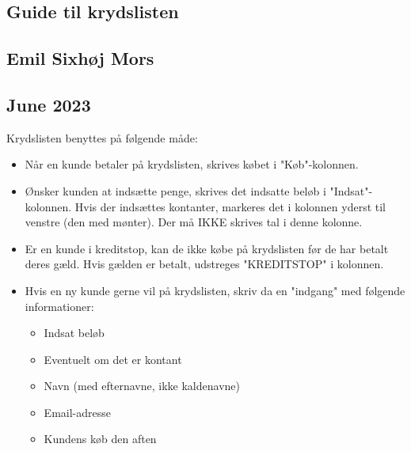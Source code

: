 \documentclass[a4paper,oneside,article,11pt,english,landscape]{memoir}
\begin{document}
{{{{\begin{landscape}
\begin{tabu}
{\end{tabu}
\fi

\begin{center}
\section*{\LARGE Guide til krydslisten}
\subsection*{Emil Sixhøj Mors}
\subsection*{\small June 2023}
\end{center}

Krydslisten benyttes på følgende måde:

\begin{itemize}
    \item Når en kunde betaler på krydslisten, skrives købet i "Køb"-kolonnen.
    \item Ønsker kunden at indsætte penge, skrives det indsatte beløb i "Indsat"-kolonnen. Hvis der indsættes kontanter, markeres det i kolonnen yderst til venstre (den med mønter). Der må IKKE skrives tal i denne kolonne.
    \item Er en kunde i kreditstop, kan de ikke købe på krydslisten før de har betalt deres gæld. Hvis gælden er betalt, udstreges "KREDITSTOP" i kolonnen.
    \item Hvis en ny kunde gerne vil på krydslisten, skriv da en "indgang" med følgende informationer:
    \begin{itemize}
        \item Indsat beløb
        \item Eventuelt om det er kontant
        \item Navn (med efternavne, ikke kaldenavne)
        \item Email-adresse
        \item Kundens køb den aften
    \end{itemize}
\end{itemize}


\end{landscape}}}}}
\end{document}
